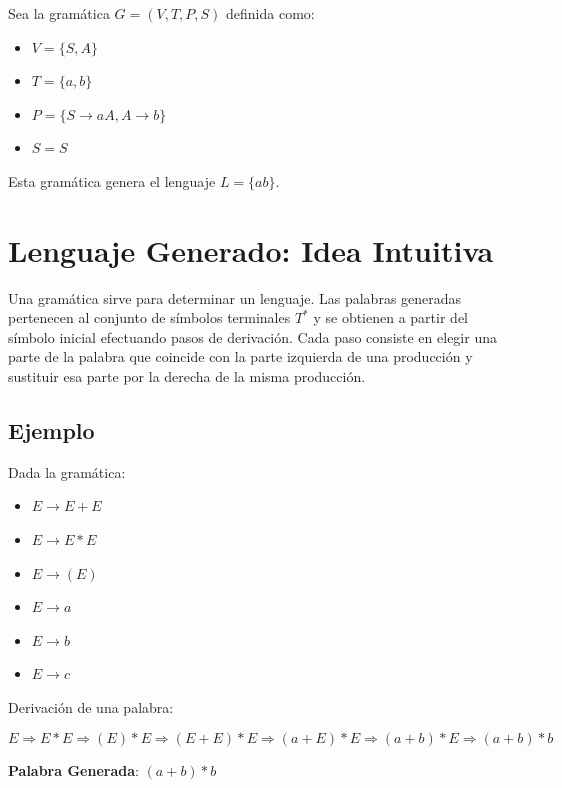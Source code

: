 \documentclass[12pt]{report} %
\providecommand{\tightlist}{%
  \setlength{\itemsep}{0pt}\setlength{\parskip}{0pt}}
\begin{document}
\begin{ejemplo}
Sea la gramática $G = (V, T, P, S)$ definida como:  
    \begin{itemize}
        \item $V = \{S, A\}$  
        \item $T = \{a, b\}$  
        \item $P = \{S \to aA, A \to b\}$  
        \item $S = S$  
    \end{itemize}
\end{ejemplo}

Esta gramática genera el lenguaje \(L = \{ab\}\).

\hypertarget{lenguaje-generado-idea-intuitiva}{%
\section{Lenguaje Generado: Idea
Intuitiva}\label{lenguaje-generado-idea-intuitiva}}

Una gramática sirve para determinar un lenguaje. Las palabras generadas
pertenecen al conjunto de símbolos terminales \(T^*\) y se obtienen a
partir del símbolo inicial efectuando pasos de derivación. Cada paso
consiste en elegir una parte de la palabra que coincide con la parte
izquierda de una producción y sustituir esa parte por la derecha de la
misma producción.

\hypertarget{ejemplo}{%
\subsection{Ejemplo}\label{ejemplo}}

Dada la gramática:

\begin{itemize}
\tightlist
\item
  \(E \to E + E\)
\item
  \(E \to E * E\)
\item
  \(E \to (E)\)
\item
  \(E \to a\)
\item
  \(E \to b\)
\item
  \(E \to c\)
\end{itemize}

Derivación de una palabra:

\[
E \Rightarrow E * E \Rightarrow (E) * E \Rightarrow (E + E) * E \Rightarrow (a + E) * E \Rightarrow (a + b) * E \Rightarrow (a + b) * b
\]

\textbf{Palabra Generada}: \((a + b) * b\)
\end{document}

